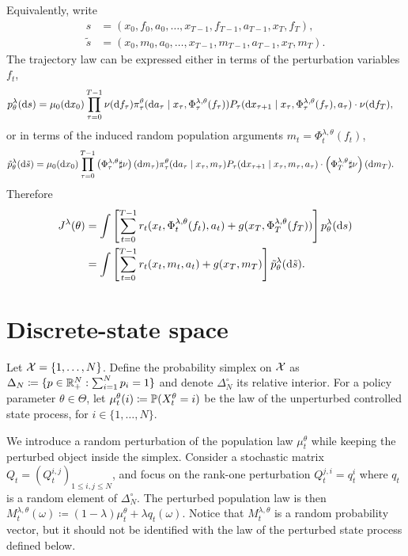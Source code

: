 Equivalently, write
\begin{align}
    s
    &=
    (x_0,f_0,a_0,\ldots,x_{T-1},f_{T-1},a_{T-1},x_T,f_T),\\
    \tilde s
    &=
    (x_0,m_0,a_0,\ldots,x_{T-1},m_{T-1},a_{T-1},x_T,m_T).
\end{align}
The trajectory law can be expressed either in terms of the perturbation variables $f_t$,
\begin{align}
    p_\theta^\lambda(\d s)
    &=
    \mu_0(\d x_0)
    \prod_{\tau=0}^{T-1}
    \nu(\d f_\tau)
    \pi_\tau^\theta(\d a_\tau\mid x_\tau,\Phi_\tau^{\lambda,\theta}(f_\tau))
    P_\tau(\d x_{\tau+1}\mid x_\tau,\Phi_\tau^{\lambda,\theta}(f_\tau),a_\tau)
    \cdot\nu(\d f_T),
\end{align}
or in terms of the induced random population arguments $m_t=\Phi_t^{\lambda,\theta}(f_t)$,
\begin{align}
    \tilde p_\theta^\lambda(\d\tilde s)
    &=
    \mu_0(\d x_0)
    \prod_{\tau=0}^{T-1}
    \left(\Phi_\tau^{\lambda,\theta}\sharp\nu\right)(\d m_\tau)
    \pi_\tau^\theta(\d a_\tau\mid x_\tau,m_\tau)
    P_\tau(\d x_{\tau+1}\mid x_\tau,m_\tau,a_\tau)
    \cdot
    \left(\Phi_T^{\lambda,\theta}\sharp\nu\right)(\d m_T).
\end{align}
Therefore
\begin{align}
    J^{\lambda}(\theta)
    &=
    \int
    \left[
        \sum_{t=0}^{T-1}
        r_t(x_t,\Phi_t^{\lambda,\theta}(f_t),a_t)
        +
        g(x_T,\Phi_T^{\lambda,\theta}(f_T))
    \right]
    p_{\theta}^\lambda(\d s)\\
    &=
    \int
    \left[
        \sum_{t=0}^{T-1} r_t(x_t,m_t,a_t)
        +
        g(x_T,m_T)
    \right]
    \tilde p_{\theta}^\lambda(\d\tilde s).
\end{align}

\section{Discrete-state space}

Let $\Xc=\{1,\ldots,N\}$. Define the probability simplex on $\Xc$ as $\Delta_N\coloneqq\{p\in\R_+^N : \sum_{i=1}^N p_i=1\}$ and denote $\Delta_N^\circ$ its relative interior. For a policy parameter $\theta\in\Theta$, let $\mu_t^\theta(i)\coloneqq \P(X_t^\theta=i)$ be the law of the unperturbed controlled state process, for $i\in\{1,\ldots,N\}$.

We introduce a random perturbation of the population law $\mu_t^\theta$ while keeping the perturbed object inside the simplex. Consider a stochastic matrix $Q_t = (Q_t^{i,j})_{1\leq i,j\leq N}$, and focus on the rank-one perturbation $Q_t^{j,i} = q_t^i$ where $q_t$ is a random element of $\Delta_N^\circ$. The perturbed population law is then $M_t^{\lambda,\theta}(\omega)\coloneqq (1-\lambda)\mu_t^\theta + \lambda q_t(\omega)$.
Notice that $M_t^{\lambda,\theta}$ is a random probability vector, but it should not be identified with the law of the perturbed state process defined below.

